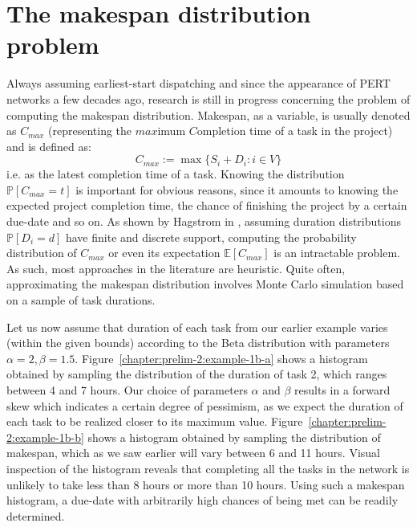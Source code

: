 \section{The makespan distribution problem}
	Always assuming earliest-start dispatching and since the appearance of PERT networks a few decades ago,
	research is still in progress concerning the problem of computing the makespan distribution.
	Makespan, as a variable, is usually denoted as $C_{max}$ (representing the $max$imum $C$ompletion time of a task in the project) and is defined as:
	\[
		C_{max} := \max\{ S_i + D_i : i \in V\}
	\]
	i.e. as the latest completion time of a task. 
	Knowing the distribution $\mathbb{P}[C_{max} = t]$ is important for obvious reasons,
	since it amounts to knowing the expected project completion time,
	the chance of finishing the project by a certain due-date and so on. 
	As shown by Hagstrom in \cite{hagstrom1990},
	assuming duration distributions $\mathbb{P}[D_i = d]$ have finite and discrete support,
	computing the probability distribution of $C_{max}$ or even its expectation $\mathbb{E}[C_{max}]$ is an intractable problem.
	As such, most approaches in the literature are heuristic.
	Quite often, approximating the makespan distribution involves Monte Carlo simulation based on a sample of task durations.

	\begin{example}
		Let us now assume that duration of each task from our earlier example varies (within the given bounds)
		according to the Beta distribution with parameters $\alpha = 2, \beta = 1.5$.
		Figure~\ref{chapter:prelim-2:example-1b-a} shows a histogram obtained by sampling the distribution of the duration of task 2, which ranges between 4 and 7 hours.
		Our choice of parameters $\alpha$ and $\beta$ results in a forward skew which indicates a certain degree of pessimism,
		as we expect the duration of each task to be realized closer to its maximum value.
		Figure~\ref{chapter:prelim-2:example-1b-b} shows a histogram obtained by sampling the distribution of makespan,
		which as we saw earlier will vary between 6 and 11 hours.
		Visual inspection of the histogram reveals that completing all the tasks in the network is unlikely to take less than 8 hours or more than 10 hours.
		Using such a makespan histogram, a due-date with arbitrarily high chances of being met can be readily determined.
	\end{example}

